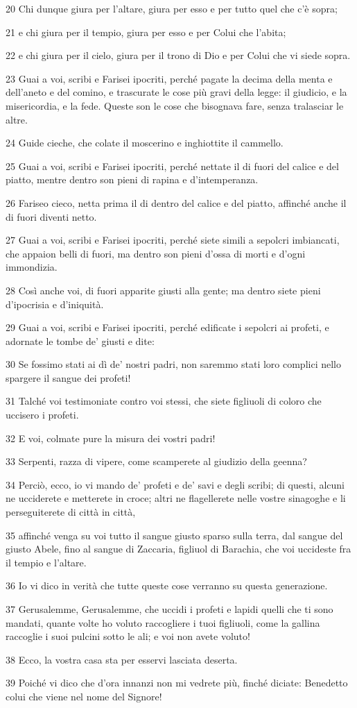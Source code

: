 \par 20 Chi dunque giura per l'altare, giura per esso e per tutto quel che c'è sopra;
\par 21 e chi giura per il tempio, giura per esso e per Colui che l'abita;
\par 22 e chi giura per il cielo, giura per il trono di Dio e per Colui che vi siede sopra.
\par 23 Guai a voi, scribi e Farisei ipocriti, perché pagate la decima della menta e dell'aneto e del comino, e trascurate le cose più gravi della legge: il giudicio, e la misericordia, e la fede. Queste son le cose che bisognava fare, senza tralasciar le altre.
\par 24 Guide cieche, che colate il moscerino e inghiottite il cammello.
\par 25 Guai a voi, scribi e Farisei ipocriti, perché nettate il di fuori del calice e del piatto, mentre dentro son pieni di rapina e d'intemperanza.
\par 26 Fariseo cieco, netta prima il di dentro del calice e del piatto, affinché anche il di fuori diventi netto.
\par 27 Guai a voi, scribi e Farisei ipocriti, perché siete simili a sepolcri imbiancati, che appaion belli di fuori, ma dentro son pieni d'ossa di morti e d'ogni immondizia.
\par 28 Così anche voi, di fuori apparite giusti alla gente; ma dentro siete pieni d'ipocrisia e d'iniquità.
\par 29 Guai a voi, scribi e Farisei ipocriti, perché edificate i sepolcri ai profeti, e adornate le tombe de' giusti e dite:
\par 30 Se fossimo stati ai dì de' nostri padri, non saremmo stati loro complici nello spargere il sangue dei profeti!
\par 31 Talché voi testimoniate contro voi stessi, che siete figliuoli di coloro che uccisero i profeti.
\par 32 E voi, colmate pure la misura dei vostri padri!
\par 33 Serpenti, razza di vipere, come scamperete al giudizio della geenna?
\par 34 Perciò, ecco, io vi mando de' profeti e de' savi e degli scribi; di questi, alcuni ne ucciderete e metterete in croce; altri ne flagellerete nelle vostre sinagoghe e li perseguiterete di città in città,
\par 35 affinché venga su voi tutto il sangue giusto sparso sulla terra, dal sangue del giusto Abele, fino al sangue di Zaccaria, figliuol di Barachia, che voi uccideste fra il tempio e l'altare.
\par 36 Io vi dico in verità che tutte queste cose verranno su questa generazione.
\par 37 Gerusalemme, Gerusalemme, che uccidi i profeti e lapidi quelli che ti sono mandati, quante volte ho voluto raccogliere i tuoi figliuoli, come la gallina raccoglie i suoi pulcini sotto le ali; e voi non avete voluto!
\par 38 Ecco, la vostra casa sta per esservi lasciata deserta.
\par 39 Poiché vi dico che d'ora innanzi non mi vedrete più, finché diciate: Benedetto colui che viene nel nome del Signore!

